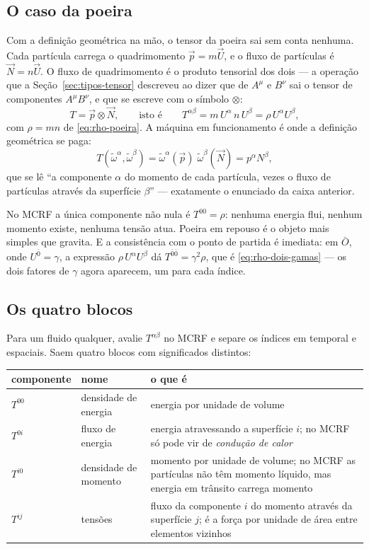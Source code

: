 \documentclass[12pt,a4paper,oneside]{book}
\theoremstyle{rgplain}
\theoremstyle{rgremark}
\begin{document}
\subsection*{O caso da poeira}

Com a definição geométrica na mão, o tensor da poeira sai sem conta nenhuma.
Cada partícula carrega o quadrimomento $\vec p=m\vec U$, e o fluxo de
partículas é $\vec N=n\vec U$. O fluxo de quadrimomento é o produto tensorial
dos dois --- a operação que a Seção~\ref{sec:tipos-tensor} descreveu ao dizer
que de $A^\mu$ e $B^\nu$ sai o tensor de componentes $A^\mu B^\nu$, e que se
escreve com o símbolo $\otimes$:
\begin{equation}
  T=\vec p\otimes\vec N ,
  \qquad\text{isto é}\qquad
  T^{\alpha\beta}=m\,U^\alpha\,n\,U^\beta=\rho\,U^\alpha U^\beta ,
  \label{eq:T-poeira}
\end{equation}
com $\rho=mn$ de \eqref{eq:rho-poeira}. A máquina em funcionamento é onde a definição geométrica se paga:
\[
  T(\tilde\omega^\alpha,\tilde\omega^\beta)
  =\tilde\omega^\alpha(\vec p)\;\tilde\omega^\beta(\vec N)
  =p^\alpha N^\beta ,
\]
que se lê ``a componente $\alpha$ do momento de cada partícula, vezes o fluxo
de partículas através da superfície $\beta$'' --- exatamente o enunciado da
caixa anterior.

No MCRF a única componente não nula é $T^{00}=\rho$: nenhuma energia flui,
nenhum momento existe, nenhuma tensão atua. Poeira em repouso é o objeto mais
simples que gravita. E a consistência com o ponto de partida é imediata: em
$\bar O$, onde $U^{\bar 0}=\gamma$, a expressão $\rho\,U^\alpha U^\beta$ dá
$T^{\bar 0\bar 0}=\gamma^2\rho$, que é \eqref{eq:rho-dois-gamas} --- os dois
fatores de $\gamma$ agora aparecem, um para cada índice.

\subsection*{Os quatro blocos}

Para um fluido qualquer, avalie $T^{\alpha\beta}$ no MCRF e separe os índices
em temporal e espaciais. Saem quatro blocos com significados distintos:

\begin{center}
\small
\begin{tabular}{llp{7.4cm}}
\toprule
componente & nome & o que é \\
\midrule
$T^{00}$ & densidade de energia & energia por unidade de volume \\
$T^{0i}$ & fluxo de energia & energia atravessando a superfície $i$; no MCRF
só pode vir de \emph{condução de calor} \\
$T^{i0}$ & densidade de momento & momento por unidade de volume; no MCRF as
partículas não têm momento líquido, mas energia em trânsito carrega momento \\
$T^{ij}$ & tensões & fluxo da componente $i$ do momento através da superfície
$j$; é a força por unidade de área entre elementos vizinhos \\
\bottomrule
\end{tabular}
\end{center}
\end{document}
